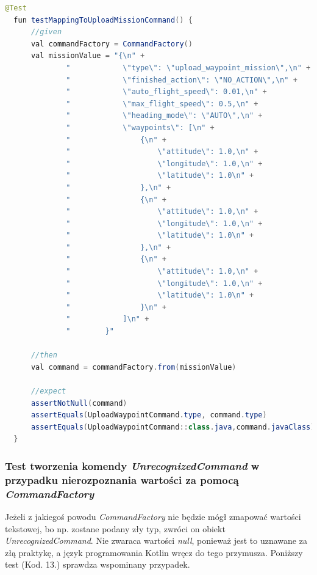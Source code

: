 \begin{lstlisting}[language=Java, caption=Test tworzenia komendy \textit{UploadWaypointCommand}]
  @Test
  fun testMappingToUploadMissionCommand() {
      //given
      val commandFactory = CommandFactory()
      val missionValue = "{\n" +
              "            \"type\": \"upload_waypoint_mission\",\n" +
              "            \"finished_action\": \"NO_ACTION\",\n" +
              "            \"auto_flight_speed\": 0.01,\n" +
              "            \"max_flight_speed\": 0.5,\n" +
              "            \"heading_mode\": \"AUTO\",\n" +
              "            \"waypoints\": [\n" +
              "                {\n" +
              "                    \"attitude\": 1.0,\n" +
              "                    \"longitude\": 1.0,\n" +
              "                    \"latitude\": 1.0\n" +
              "                },\n" +
              "                {\n" +
              "                    \"attitude\": 1.0,\n" +
              "                    \"longitude\": 1.0,\n" +
              "                    \"latitude\": 1.0\n" +
              "                },\n" +
              "                {\n" +
              "                    \"attitude\": 1.0,\n" +
              "                    \"longitude\": 1.0,\n" +
              "                    \"latitude\": 1.0\n" +
              "                }\n" +
              "            ]\n" +
              "        }"

      //then
      val command = commandFactory.from(missionValue)

      //expect
      assertNotNull(command)
      assertEquals(UploadWaypointCommand.type, command.type)
      assertEquals(UploadWaypointCommand::class.java,command.javaClass)
  }
\end{lstlisting}

\subsubsection{Test tworzenia komendy \textit{UnrecognizedCommand} w przypadku nierozpoznania wartości za pomocą \textit{CommandFactory}}
Jeżeli z jakiegoś powodu \textit{CommandFactory} nie będzie mógł zmapować wartości tekstowej, bo np. zostane podany zły typ, zwróci on obiekt \textit{UnrecognizedCommand}. Nie zwaraca wartości \textit{null}, ponieważ jest to uznawane za złą praktykę, a język programowania Kotlin wręcz do tego przymusza. Poniższy test (Kod. 13.) sprawdza wspominany przypadek.

